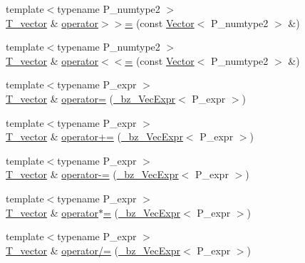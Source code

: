 \begin{DoxyCompactItemize}
\item 
{\footnotesize template$<$typename P\+\_\+numtype2 $>$ }\\\hyperlink{classVector_a29e279edfeac4d65aad0d814c05cfaf0}{T\+\_\+vector} \& \hyperlink{classVector_a338cae65552414f10226591015957b5d}{operator$>$$>$=} (const \hyperlink{classVector}{Vector}$<$ P\+\_\+numtype2 $>$ \&)
\item 
{\footnotesize template$<$typename P\+\_\+numtype2 $>$ }\\\hyperlink{classVector_a29e279edfeac4d65aad0d814c05cfaf0}{T\+\_\+vector} \& \hyperlink{classVector_ad0be53b402edde83f54541d7ea33c789}{operator$<$$<$=} (const \hyperlink{classVector}{Vector}$<$ P\+\_\+numtype2 $>$ \&)
\item 
{\footnotesize template$<$typename P\+\_\+expr $>$ }\\\hyperlink{classVector_a29e279edfeac4d65aad0d814c05cfaf0}{T\+\_\+vector} \& \hyperlink{classVector_a2a35e44b69873006b952adfb5351d227}{operator=} (\hyperlink{class__bz__VecExpr}{\+\_\+bz\+\_\+\+Vec\+Expr}$<$ P\+\_\+expr $>$)
\item 
{\footnotesize template$<$typename P\+\_\+expr $>$ }\\\hyperlink{classVector_a29e279edfeac4d65aad0d814c05cfaf0}{T\+\_\+vector} \& \hyperlink{classVector_a0800418a23b9db15f3c5260b2f91d62a}{operator+=} (\hyperlink{class__bz__VecExpr}{\+\_\+bz\+\_\+\+Vec\+Expr}$<$ P\+\_\+expr $>$)
\item 
{\footnotesize template$<$typename P\+\_\+expr $>$ }\\\hyperlink{classVector_a29e279edfeac4d65aad0d814c05cfaf0}{T\+\_\+vector} \& \hyperlink{classVector_a366bff20f2140a525f40d8d37e796c61}{operator-\/=} (\hyperlink{class__bz__VecExpr}{\+\_\+bz\+\_\+\+Vec\+Expr}$<$ P\+\_\+expr $>$)
\item 
{\footnotesize template$<$typename P\+\_\+expr $>$ }\\\hyperlink{classVector_a29e279edfeac4d65aad0d814c05cfaf0}{T\+\_\+vector} \& \hyperlink{classVector_a692a90b6f985cbb76a8988e693bc3b9c}{operator$\ast$=} (\hyperlink{class__bz__VecExpr}{\+\_\+bz\+\_\+\+Vec\+Expr}$<$ P\+\_\+expr $>$)
\item 
{\footnotesize template$<$typename P\+\_\+expr $>$ }\\\hyperlink{classVector_a29e279edfeac4d65aad0d814c05cfaf0}{T\+\_\+vector} \& \hyperlink{classVector_a82ac2d32c4c73204c884d6563c15a133}{operator/=} (\hyperlink{class__bz__VecExpr}{\+\_\+bz\+\_\+\+Vec\+Expr}$<$ P\+\_\+expr $>$)
\item 

\end{DoxyCompactItemize}
